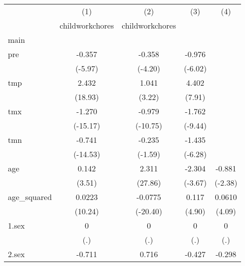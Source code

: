 
\begin{tabular}{l*{4}{c}}
\hline\hline
            &\multicolumn{1}{c}{(1)}&\multicolumn{1}{c}{(2)}&\multicolumn{1}{c}{(3)}&\multicolumn{1}{c}{(4)}\\
            &\multicolumn{1}{c}{childworkchores}&\multicolumn{1}{c}{childworkchores}&\multicolumn{1}{c}{} &\multicolumn{1}{c}{} \\
\hline
main        &                     &                     &                     &                     \\
pre         &      -0.357\sym{***}&      -0.358\sym{***}&      -0.976\sym{***}&                     \\
            &     (-5.97)         &     (-4.20)         &     (-6.02)         &                     \\
[1em]
tmp         &       2.432\sym{***}&       1.041\sym{**} &       4.402\sym{***}&                     \\
            &     (18.93)         &      (3.22)         &      (7.91)         &                     \\
[1em]
tmx         &      -1.270\sym{***}&      -0.979\sym{***}&      -1.762\sym{***}&                     \\
            &    (-15.17)         &    (-10.75)         &     (-9.44)         &                     \\
[1em]
tmn         &      -0.741\sym{***}&      -0.235         &      -1.435\sym{***}&                     \\
            &    (-14.53)         &     (-1.59)         &     (-6.28)         &                     \\
[1em]
age         &       0.142\sym{***}&       2.311\sym{***}&      -2.304\sym{***}&      -0.881\sym{*}  \\
            &      (3.51)         &     (27.86)         &     (-3.67)         &     (-2.38)         \\
[1em]
age\_squared &      0.0223\sym{***}&     -0.0775\sym{***}&       0.117\sym{***}&      0.0610\sym{***}\\
            &     (10.24)         &    (-20.40)         &      (4.90)         &      (4.09)         \\
[1em]
1.sex       &           0         &           0         &           0         &           0         \\
            &         (.)         &         (.)         &         (.)         &         (.)         \\
[1em]
2.sex       &      -0.711\sym{***}&       0.716         &      -0.427         &      -0.298         \\

\end{tabular}
